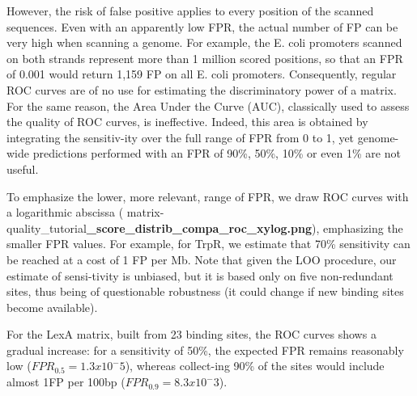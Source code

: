 However, the risk of false positive applies to every position of the
scanned sequences. Even with an apparently low FPR, the actual number
of FP can be very high when scanning a genome. For example, the
E. coli promoters scanned on both strands represent more than 1
million scored positions, so that an FPR of 0.001 would return 1,159
FP on all E. coli promoters. Consequently, regular ROC curves are of
no use for estimating the discriminatory power of a matrix. For the
same reason, the Area Under the Curve (AUC), classically used to
assess the quality of ROC curves, is ineffective. Indeed, this area is
obtained by integrating the sensitiv-ity over the full range of FPR
from 0 to 1, yet genome-wide predictions performed with an FPR of
90\%, 50\%, 10\% or even 1\% are not useful.

To emphasize the lower, more relevant, range of FPR, we draw ROC
curves with a logarithmic abscissa (
matrix-quality\_tutorial\textbf{\_score\_distrib\_compa\_roc\_xylog.png}),
emphasizing the smaller FPR values. For example, for TrpR, we estimate
that 70\% sensitivity can be reached at a cost of 1 FP per Mb. Note
that given the LOO procedure, our estimate of sensi-tivity is
unbiased, but it is based only on five non-redundant sites, thus being
of questionable robustness (it could change if new binding sites
become available).

For the LexA matrix, built from 23 binding sites, the ROC curves shows
a gradual increase: for a sensitivity of 50\%, the expected FPR
remains reasonably low (\(FPR_{0.5} =1.3x10^-5\)), whereas collect-ing
90\% of the sites would include almost 1FP per 100bp (\(FPR_{0.9}
=8.3x10^-3\)).


